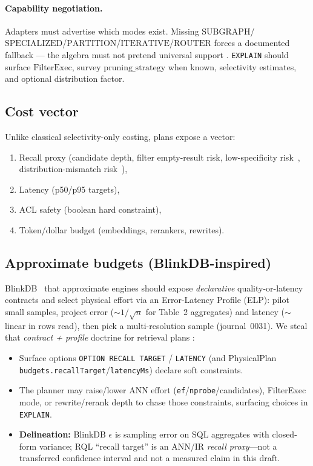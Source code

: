 \paragraph{Capability negotiation.}
Adapters must advertise which modes exist.
Missing $\mathrm{SUBGRAPH}$/$\mathrm{SPECIALIZED}$/$\mathrm{PARTITION}$/$\mathrm{ITERATIVE}$/$\mathrm{ROUTER}$ forces a documented fallback --- the algebra must not pretend universal support \hypothesis{}.
\texttt{EXPLAIN} should surface $\mathrm{FilterExec}$, survey $\mathrm{pruning\_strategy}$ when known, selectivity estimates, and optional distribution factor.

\subsection{Cost vector}
Unlike classical selectivity-only costing, plans expose a vector:
\begin{enumerate}
  \item Recall proxy (candidate depth, filter empty-result risk, low-specificity risk~\citep{gollapudi2023filtered}, distribution-mismatch risk~\citep{lin2025fanns}),
  \item Latency (p50/p95 targets),
  \item ACL safety (boolean hard constraint),
  \item Token/dollar budget (embeddings, rerankers, rewrites).
\end{enumerate}
\subsection{Approximate budgets (BlinkDB-inspired)}
\label{sec:budgets}
BlinkDB~\citep{agarwal2013blinkdb} \established{} that approximate engines should expose \emph{declarative} quality-or-latency contracts and select physical effort via an Error-Latency Profile (ELP): pilot small samples, project error ($\sim 1/\sqrt{n}$ for Table~2 aggregates) and latency ($\sim$linear in rows read), then pick a multi-resolution sample (journal~0031).
We steal that \emph{contract + profile} doctrine for retrieval plans \hypothesis{}:
\begin{itemize}
  \item Surface options \texttt{OPTION RECALL TARGET} / \texttt{LATENCY} (and PhysicalPlan \texttt{budgets.recallTarget}/\texttt{latencyMs}) declare soft constraints.
  \item The planner may raise/lower ANN effort (\texttt{ef}/\texttt{nprobe}/candidates), FilterExec mode, or rewrite/rerank depth to chase those constraints, surfacing choices in \texttt{EXPLAIN}.
  \item \textbf{Delineation:} BlinkDB $\epsilon$ is sampling error on SQL aggregates with closed-form variance; RQL ``recall target'' is an ANN/IR \emph{recall proxy}---not a transferred confidence interval and not a measured claim in this draft.
\end{itemize}

